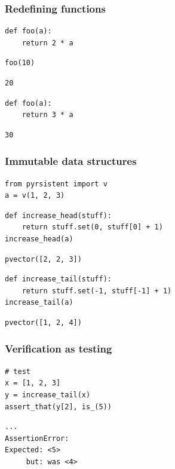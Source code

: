 \begin{frame}[fragile]
\frametitle{Redefining functions}

\begin{lstlisting}[frame=single]
def foo(a):
    return 2 * a
\end{lstlisting}

\begin{lstlisting}[frame=single]
foo(10)
\end{lstlisting}

\begin{lstlisting}[frame=single]
20
\end{lstlisting}

\begin{lstlisting}[frame=single]
def foo(a):
    return 3 * a
\end{lstlisting}

\begin{lstlisting}[frame=single]
30
\end{lstlisting}

\end{frame}

\begin{frame}[fragile]
\frametitle{Immutable data structures}

\begin{lstlisting}[frame=single]
from pyrsistent import v
a = v(1, 2, 3)
\end{lstlisting}

\begin{lstlisting}[frame=single]
def increase_head(stuff):
    return stuff.set(0, stuff[0] + 1)
increase_head(a)
\end{lstlisting}

\begin{lstlisting}[frame=single]
pvector([2, 2, 3])
\end{lstlisting}

\begin{lstlisting}[frame=single]
def increase_tail(stuff):
    return stuff.set(-1, stuff[-1] + 1)
increase_tail(a)
\end{lstlisting}

\begin{lstlisting}[frame=single]
pvector([1, 2, 4])
\end{lstlisting}

\end{frame}

\begin{frame}[fragile]
\frametitle{Verification as testing}

\begin{lstlisting}[frame=single]
# test
x = [1, 2, 3]
y = increase_tail(x)
assert_that(y[2], is_(5))
\end{lstlisting}

\begin{lstlisting}[frame=single]
...
AssertionError: 
Expected: <5>
     but: was <4>
\end{lstlisting}

\end{frame}

